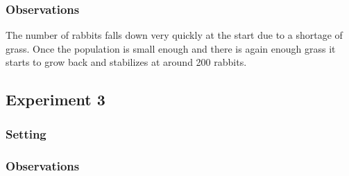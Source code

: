\documentclass[11pt]{article}
\begin{document}
\subsubsection{Observations}
The number of rabbits falls down very quickly at the start due to a
shortage of grass. Once the population is small enough and there is
again enough grass it starts to grow back and stabilizes at around 200
rabbits.

\subsection{Experiment 3}

\subsubsection{Setting}

\subsubsection{Observations}
\end{document}
